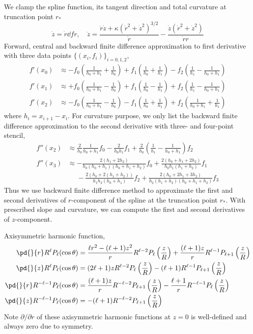 \documentclass{jfm}
\begin{document}
We clamp the spline function, its tangent direction and total curvature at truncation point $r_*$
\begin{equation}
\dot{z}=\dot{r}\dd{f}{r},\quad
\ddot{z}
=\frac{\ddot{r} \dot{z}+\kappa   (\dot{r}^2+\dot{z}^2)^{3/2}
 }{\dot{r} }
-
\frac{\dot{z} \left(\dot{r}^2+\dot{z}^2\right)}{\dot{r} r}
\end{equation}
Forward, central and backward finite difference approximation to first derivative 
with three data points $\{(x_i,f_i)\}_{i=0,1,2}$,
\begin{align}
f'(x_0)&\approx-f_0 \left(\frac{1}{h_0+h_1}+\frac{1}{h_0}\right)+f_1 \left(\frac{1}{h_0}
+\frac{1}{h_1}\right)-f_2 \left(\frac{1}{h_1}-\frac{1}{h_0+h_1}\right)\\
f'(x_1)&\approx+f_0 \left(\frac{1}{h_0+h_1}-\frac{1}{h_0}\right)+f_1 \left(\frac{1}{h_0}
-\frac{1}{h_1}\right)+f_2 \left(\frac{1}{h_1}-\frac{1}{h_0+h_1}\right)\\
f'(x_2)&\approx-f_0 \left(\frac{1}{h_0+h_1}-\frac{1}{h_0}\right)-f_1 \left(\frac{1}{h_0}
+\frac{1}{h_1}\right)+f_2 \left(\frac{1}{h_0+h_1}+\frac{1}{h_1}\right)
\end{align}
where $h_i = x_{i+1} - x_i$.
For curvature purpose, we only list the backward finite difference approximation to the second derivative
with three- and four-point stencil,
\begin{align}
f''(x_2)&\approx\frac{2}{h_0}\frac{1}{h_0+h_1} f_ 0-\frac{2 }{h_0 h_1}f_ 1
+ \frac{2}{h_ 0}\left(\frac{1}{ h_ 1}-\frac{1}{h_ 0+h_ 1}\right)f_ 2\\
\nonumber f''(x_3)&\approx-\frac{2 (h_1+2 h_2)}{h_0 (h_0+h_1) (h_0+h_1+h_2)} f_0
+\frac{2  (h_0+h_1+2 h_2)}{h_0 h_1 (h_1+h_2)}f_1\\
&\phantom{\approx}-\frac{2  (h_0+2 (h_1+h_2))}{h_1 h_2 (h_0+h_1)}f_2
+\frac{2  (h_0+2 h_1+3 h_2)}{h_2 (h_1+h_2) (h_0+h_1+h_2)}f_3
\end{align}
Thus we use backward finite difference method to approximate the first and second derivatives of $r$-component of the spline at the truncation point $r_*$.
With prescribed slope and curvature, we can compute the first and second derivatives of $z$-component.

Axisymmetric harmonic function,
\begin{align}
\pd{}{r}R^\ell P_\ell(\cos\theta)
&=\frac{ \ell r^2-(\ell +1)z^2 }{r}R^{\ell-2}P_\ell\left(\frac{z}{R}\right)
+\frac{(\ell+1) z }{r} R^{\ell-1}P_{\ell+1}\left(\frac{z}{R}\right)\\
\pd{}{z}R^\ell P_\ell(\cos\theta)
&=(2 \ell+1) z R^{\ell-2} P_\ell\left(\frac{z}{R}\right)-(\ell+1) R^{\ell-1} P_{\ell+1}\left(\frac{z}{R}\right)\\
\pd{}{r}R^{-\ell-1} P_\ell(\cos\theta)&=\frac{(\ell+1) z }{r}R^{-\ell-2} P_{\ell+1}\left(\frac{z}{R}\right)
-\frac{\ell+1 }{r}R^{-\ell-1} P_\ell\left(\frac{z}{R}\right)\\
\pd{}{z}R^{-\ell-1} P_\ell(\cos\theta)&=-(\ell+1) R^{-\ell-2} P_{\ell+1}\left(\frac{z}{R}\right)
\end{align}
Note $\partial /\partial r$ of these axisymmetric harmonic functions at $z=0$ is well-defined and always zero due to symmetry.
\end{document}
